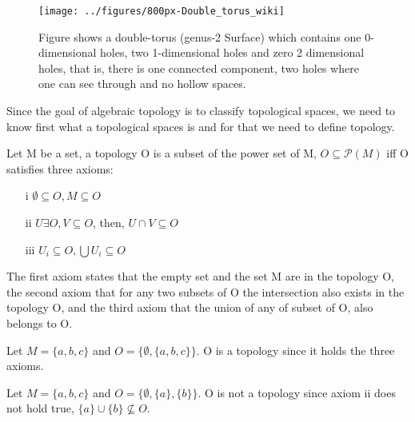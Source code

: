 \documentclass[onecollarge,runningheads]{svjour2}
\begin{document}
\begin{figure}[h]
        \centering
        \texttt{[image: ../figures/800px-Double\_torus\_wiki]}
        \caption{Figure shows a double-torus (genus-2 Surface) which contains one 0-dimensional holes, two 1-dimensional holes and zero 2 dimensional holes, that is, there is one connected component, two holes where one can see through and no hollow spaces. }
\label{fig:topoforms}
\end{figure}
 
Since the goal of algebraic topology is to classify topological spaces, we need to know first what a topological spaces is and for that we need to define topology.

\begin{definition}
Let M be a set, a topology O is a subset of the power set of M, $O \subseteq \mathcal{P}(M)$ iff O  satisfies three axioms:
\begin{itemize}
\item[i] $\emptyset \subseteq O, M \subseteq O$
\item[ii] $U \exists O, V \subseteq O$, then, $U \cap V \subseteq O$
\item[iii] $U_i \subseteq O, \bigcup  U_i \subseteq O$
\end{itemize}
\label{def:topology}
\end{definition}
The first axiom states that the empty set and the set M are in the topology O, the second axiom that for any two subsets of O the intersection also exists in the topology O, and the third axiom that the union of any of subset of O, also belongs to O. 

\begin{example}
Let $M = \{a,b,c\}$ and $O = \{\emptyset, \{a,b,c\}\}$. O is a topology since it holds the three axioms.
\end{example}
\begin{example}
Let $M = \{a,b,c\}$ and $O = \{\emptyset, \{a\}, \{b\}\}$. O is not a topology since axiom ii does not hold true, $\{a\} \cup \{b\} \nsubseteq O$.
\end{example}
\end{document}
